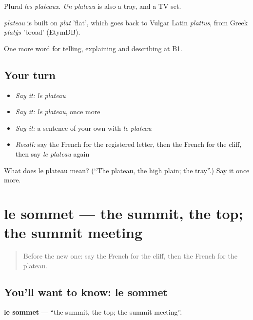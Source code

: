 Plural \emph{les plateaux}. \emph{Un plateau} is also a tray, and a TV set.

\begin{cousinweb}
\emph{plateau} is built on \emph{plat} 'flat', which goes back to Vulgar Latin \emph{plattus}, from Greek \emph{platýs} 'broad' (EtymDB).
\end{cousinweb}

\begin{grammarlens}[title={What you've built}]
One more word for telling, explaining and describing at B1.
\end{grammarlens}

\subsection*{Your turn}
\begin{itemize}
\raggedright
  \item \emph{Say it:} \emph{le plateau}
  \item \emph{Say it:} \emph{le plateau}, once more
  \item \emph{Say it:} a sentence of your own with \emph{le plateau}
  \item \emph{Recall:} say the French for the registered letter, then the French for the cliff, then say \emph{le plateau} again
\end{itemize}

\begin{tcolorbox}[breakable,colback=teal!4,colframe=teal!35!black,title={Before you move on}]
What does le plateau mean? (\textquotedblleft{}The plateau, the high plain; the tray\textquotedblright{}.) Say it once more.
\end{tcolorbox}
\section[le sommet]{le sommet — the summit, the top; the summit meeting}

\label{lesson:FR-C454-sommet}



\begin{quote}
Before the new one: say the French for the cliff, then the French for the plateau.
\end{quote}

\subsection*{You'll want to know: le sommet}
\textbf{le sommet} — \textquotedblleft{}the summit, the top; the summit meeting\textquotedblright{}.

